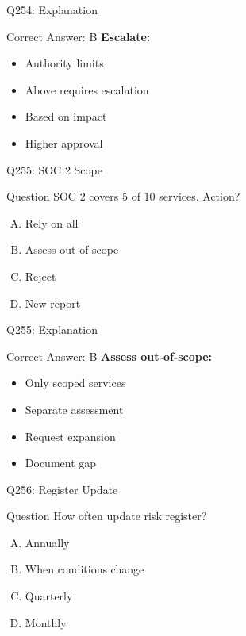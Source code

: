 \documentclass{beamer}
\begin{document}
	\begin{frame}{Q254: Explanation}
		\begin{block}{Correct Answer: B}
			\textbf{Escalate:}
			\begin{itemize}
				\item Authority limits
				\item Above requires escalation
				\item Based on impact
				\item Higher approval
			\end{itemize}
		\end{block}
	\end{frame}
	
	\begin{frame}{Q255: SOC 2 Scope}
		\begin{block}{Question}
			SOC 2 covers 5 of 10 services. Action?
		\end{block}
		\begin{enumerate}[(A)]
			\item Rely on all
			\item Assess out-of-scope
			\item Reject
			\item New report
		\end{enumerate}
	\end{frame}
	
	\begin{frame}{Q255: Explanation}
		\begin{block}{Correct Answer: B}
			\textbf{Assess out-of-scope:}
			\begin{itemize}
				\item Only scoped services
				\item Separate assessment
				\item Request expansion
				\item Document gap
			\end{itemize}
		\end{block}
	\end{frame}
	
	\begin{frame}{Q256: Register Update}
		\begin{block}{Question}
			How often update risk register?
		\end{block}
		\begin{enumerate}[(A)]
			\item Annually
			\item When conditions change
			\item Quarterly
			\item Monthly
		\end{enumerate}
	\end{frame}
	
\end{document}
